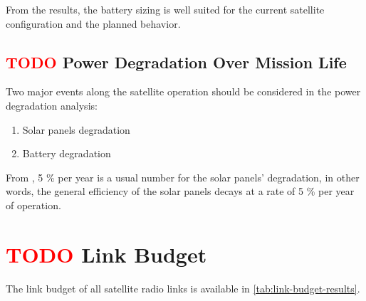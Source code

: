 From the results, the battery sizing is well suited for the current satellite configuration and the planned behavior.

\subsection{ \textcolor{red}{TODO} Power Degradation Over Mission Life}

Two major events along the satellite operation should be considered in the power degradation analysis:

\begin{enumerate}
    \item Solar panels degradation
    \item Battery degradation
\end{enumerate}

From \cite{larson2005}, 5 \% per year is a usual number for the solar panels' degradation, in other words, the general efficiency of the solar panels decays at a rate of 5 \% per year of operation.%


\section{ \textcolor{red}{TODO} Link Budget}

The link budget of all satellite radio links is available in \autoref{tab:link-budget-results}.

